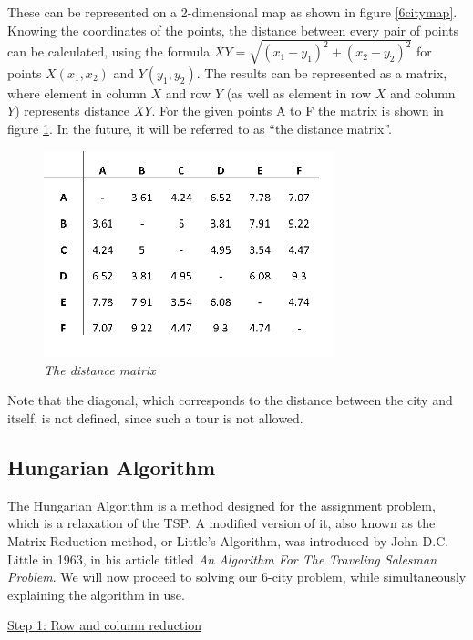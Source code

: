 \noindent These can be represented on a 2-dimensional map as shown in figure \ref{6citymap}. Knowing the coordinates of the points, the distance between every pair of points can be calculated, using the formula $XY=\sqrt{(x_1-y_1)^2+(x_2-y_2)^2}$  for points $X(x_1, x_2)$ and $Y(y_1, y_2)$. The results can be represented as a matrix, where element in column $X$ and row $Y$ (as well as element in row $X$ and column $Y$) represents distance $XY$. For the given points A to F the matrix is shown in figure \ref{distancematrix}. In the future, it will be referred to as “the distance matrix”.

\begin{figure}[h] 
	\centering
	\includegraphics[height=6cm]{distancematrix}
	\caption{\textsl{The distance matrix}}
	\label{distancematrix}
\end{figure}
\noindent Note that the diagonal, which corresponds to the distance between the city and itself, is not defined, since such a tour is not allowed.

\subsection{Hungarian Algorithm}
\label{HA}

The Hungarian Algorithm is a method designed for the assignment problem, which is a relaxation of the TSP. A modified version of it, also known as the Matrix Reduction method, or Little’s Algorithm, was introduced by John D.C. Little in 1963, in his article titled \textit{An Algorithm For The Traveling Salesman Problem}. We will now proceed to solving our 6-city problem, while simultaneously explaining the algorithm in use.

\vspace{5mm}
\noindent
\underline{Step 1: Row and column reduction}
\vspace{1mm}

